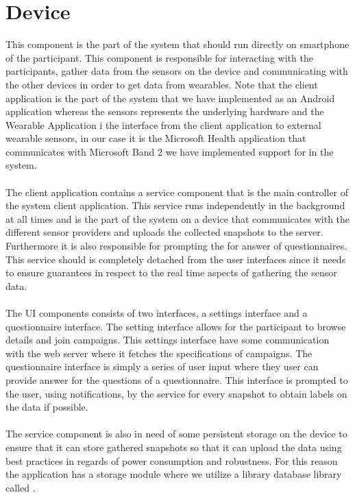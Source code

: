 \section{Device}
This component is the part of the system that should run directly on smartphone of the participant. This component is responsible for interacting with the participants, gather data from the sensors on the device and communicating with the other devices in order to get data from wearables. Note that the client application is the part of the system that we have implemented as an Android application whereas the sensors represents the underlying hardware and the Wearable Application i the interface from the client application to external wearable sensors, in our case it is the Microsoft Health application that communicates with Microsoft Band 2 we have implemented support for in the system.
\\\\
The client application contains a service component that is the main controller of the system client application. This service runs independently in the background at all times and is the part of the system on a device that communicates with the different sensor providers and uploads the collected snapshots to the server. Furthermore it is also responsible for prompting the for answer of questionnaires. This service should is completely detached from the user interfaces since it needs to ensure guarantees in respect to the real time aspects of gathering the sensor data.
\\\\
The UI components consists of two interfaces, a settings interface and a questionnaire interface. The setting interface allows for the participant to browse details and join campaigns. This settings interface have some communication with the web server where it fetches the specifications of campaigns. The questionnaire interface is simply a series of user input where they user can provide answer for the questions of a questionnaire. This interface is prompted to the user, using notifications, by the service for every snapshot to obtain labels on the data if possible.
\\\\
The service component is also in need of some persistent storage on the device to ensure that it can store gathered snapshots so that it can upload the data using best practices in regards of power consumption and robustness. For this reason the application has a storage module where we utilize a library database library called .
